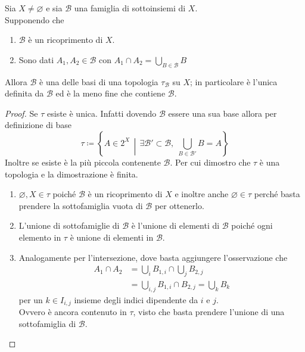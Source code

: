 \begin{theorem}
	\label{thr:set_simil_base_generate_top}
	Sia $X \neq \varnothing$ e sia $\mathcal{B}$ una famiglia di sottoinsiemi di $X$. \\ Supponendo che 
	\begin{enumerate}
		\item $\mathcal{B}$ è un ricoprimento di $X$.
		\item Sono dati $A_1, A_2 \in \mathcal{B}$ con $A_1 \cap A_2 = \bigcup_{B \in \mathcal{B}} B$  
	\end{enumerate}
	Allora $\mathcal{B}$ è una delle basi di una topologia $\tau_\mathcal{B}$ su $X$; in particolare è l'unica definita da $\mathcal{B}$ ed è la meno fine che contiene $\mathcal{B}$.
\end{theorem}
\begin{proof}
	Se $\tau$ esiste è unica. Infatti dovendo $\mathcal{B}$ essere una sua base allora per definizione di base 
	\begin{equation*}	
		\tau \coloneqq \left\{A \in 2^X \,\middle|\, \exists \mathcal{B}' \subset \mathcal{B} , \; \bigcup_{B \in \mathcal{B}'} B = A \right\}
	\end{equation*}
	Inoltre se esiste è la più piccola contenente $\mathcal{B}$.
	Per cui dimostro che $\tau$ è una topologia e la dimostrazione è finita.
	\begin{enumerate}
		\item $\varnothing, X \in \tau$ poiché $\mathcal{B}$ è un ricoprimento di $X$ e inoltre anche $\varnothing \in \tau$ perché basta prendere la sottofamiglia vuota di $\mathcal{B}$ per ottenerlo.
		\item L'unione di sottofamiglie di $\mathcal{B}$ è l'unione di elementi di $\mathcal{B}$ poiché ogni elemento in $\tau$ è unione di elementi in $\mathcal{B}$.
		\item Analogamente per l'intersezione, dove basta aggiungere l'osservazione che 
		\begin{align*}
			A_1 \cap A_2 & = \bigcup_{i} B_{1,i} \cap \bigcup_{j} B_{2,j} \\
				& = \bigcup_{i,j} B_{1,i} \cap B_{2,j} =\bigcup_{k} B_{k}
		\end{align*}
		per un $k \in I_{i,j}$ insieme degli indici dipendente da $i$ e $j$. \\ Ovvero è ancora contenuto in $\tau$, visto che basta prendere l'unione di una sottofamiglia di $\mathcal{B}$.
	\end{enumerate}
\end{proof}


